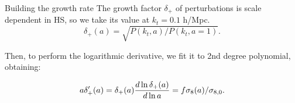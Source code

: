 \begin{block}{Building the growth rate}
The growth factor $\delta_+$ of perturbations is scale dependent in HS, so we take its value at $k_t = 0.1$ h/Mpc.
\vspace{0ex}
\begin{equation}
    \delta_+(a) = \sqrt{P(k_t,a)/P(k_t,a=1)}\text{.}
\end{equation}

Then, to perform the logarithmic derivative, we fit it to 2nd degree polynomial, obtaining:

\begin{equation}
    a\delta_+'(a) = \delta_+(a)\dv{\ln\delta_+(a)}{\ln{a}} = f\sigma_8(a)/\sigma_{8,0}\text{.}
\end{equation}


\end{block}